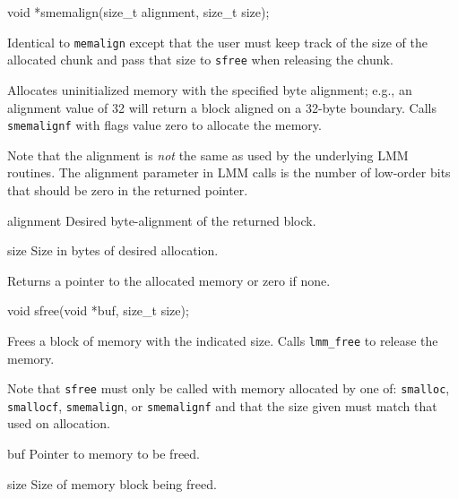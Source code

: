\label{smemalign}
\begin{apisyn}

	\funcproto void *smemalign(size_t alignment, size_t size);
\end{apisyn}
\begin{apidesc}
	Identical to {\tt memalign} except that
	the user must keep track of the size of the allocated chunk
	and pass that size to \texttt{sfree} when releasing the chunk.

	Allocates uninitialized memory with the specified byte alignment;
	e.g., an alignment value of 32 will return a block aligned on a
	32-byte boundary.
	Calls {\tt smemalignf} with flags value zero to allocate the memory.

	Note that the alignment is \emph{not} the same as used by the
	underlying LMM routines.  The alignment parameter in LMM calls
	is the number of low-order bits that should be zero in the
	returned pointer.
\end{apidesc}
\begin{apiparm}
	\item[alignment]
		Desired byte-alignment of the returned block.
	\item[size]
		Size in bytes of desired allocation.
\end{apiparm}
\begin{apiret}
	Returns a pointer to the allocated memory or zero if none.
\end{apiret}

\label{sfree}
\begin{apisyn}

	\funcproto void sfree(void *buf, size_t size);
\end{apisyn}
\begin{apidesc}
	Frees a block of memory with the indicated size.
	Calls {\tt lmm_free} to release the memory.

	Note that {\tt sfree} must only be called with memory allocated
	by one of:
	{\tt smalloc}, {\tt smallocf}, {\tt smemalign}, or {\tt smemalignf}
	and that the size given must match that used on allocation.
\end{apidesc}
\begin{apiparm}
	\item[buf]
		Pointer to memory to be freed.
	\item[size]
		Size of memory block being freed.
\end{apiparm}

